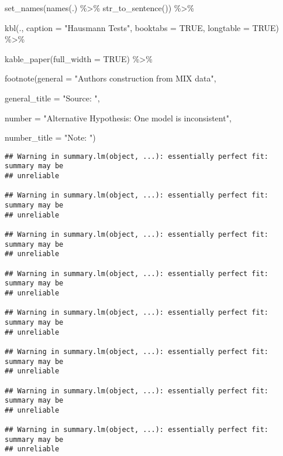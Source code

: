 \documentclass[a4paper,nobind]{templates/ociamthesis}
\newenvironment{Shaded}{\begin{snugshade}}{\end{snugshade}}
\newcommand{\AttributeTok}[1]{\textcolor[rgb]{0.77,0.63,0.00}{#1}}
\newcommand{\ConstantTok}[1]{\textcolor[rgb]{0.00,0.00,0.00}{#1}}
\newcommand{\FunctionTok}[1]{\textcolor[rgb]{0.00,0.00,0.00}{#1}}
\newcommand{\NormalTok}[1]{#1}
\newcommand{\SpecialCharTok}[1]{\textcolor[rgb]{0.00,0.00,0.00}{#1}}
\newcommand{\StringTok}[1]{\textcolor[rgb]{0.31,0.60,0.02}{#1}}
\renewenvironment{Shaded}
{
  \vspace{10pt}%
  \begin{snugshade}%
}{%
  \end{snugshade}%
  \vspace{8pt}%
}
\begin{document}
\begin{Shaded}
\begin{Highlighting}[]
  \FunctionTok{set\_names}\NormalTok{(}\FunctionTok{names}\NormalTok{(.) }\SpecialCharTok{\%\textgreater{}\%} \FunctionTok{str\_to\_sentence}\NormalTok{()) }\SpecialCharTok{\%\textgreater{}\%} 
  
  \FunctionTok{kbl}\NormalTok{(., }\AttributeTok{caption =} \StringTok{"Hausmann Tests"}\NormalTok{, }\AttributeTok{booktabs =} \ConstantTok{TRUE}\NormalTok{, }\AttributeTok{longtable =} \ConstantTok{TRUE}\NormalTok{) }\SpecialCharTok{\%\textgreater{}\%} 
  
  \FunctionTok{kable\_paper}\NormalTok{(}\AttributeTok{full\_width =} \ConstantTok{TRUE}\NormalTok{) }\SpecialCharTok{\%\textgreater{}\%} 
  
  \FunctionTok{footnote}\NormalTok{(}\AttributeTok{general =} \StringTok{"Authors\textquotesingle{} construction from MIX data"}\NormalTok{,}
           
           \AttributeTok{general\_title =} \StringTok{"Source: "}\NormalTok{, }
           
           \AttributeTok{number =} \StringTok{"Alternative Hypothesis: One model is inconsistent"}\NormalTok{,}
           
           \AttributeTok{number\_title =} \StringTok{"Note: "}\NormalTok{)}
\end{Highlighting}
\end{Shaded}

\begin{verbatim}
## Warning in summary.lm(object, ...): essentially perfect fit: summary may be
## unreliable

## Warning in summary.lm(object, ...): essentially perfect fit: summary may be
## unreliable

## Warning in summary.lm(object, ...): essentially perfect fit: summary may be
## unreliable

## Warning in summary.lm(object, ...): essentially perfect fit: summary may be
## unreliable

## Warning in summary.lm(object, ...): essentially perfect fit: summary may be
## unreliable

## Warning in summary.lm(object, ...): essentially perfect fit: summary may be
## unreliable

## Warning in summary.lm(object, ...): essentially perfect fit: summary may be
## unreliable

## Warning in summary.lm(object, ...): essentially perfect fit: summary may be
## unreliable
\end{verbatim}
\end{document}
